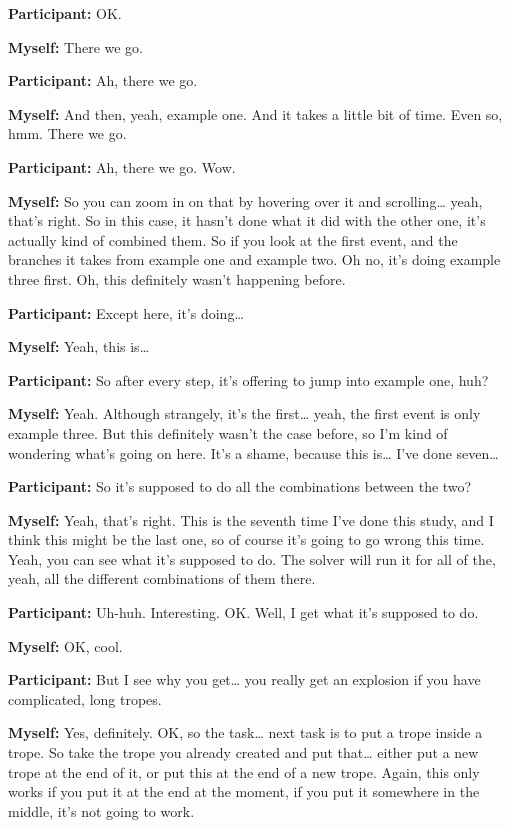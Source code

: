 \documentclass[11pt]{report}
\begin{document}
\begin{linenumbers}
\textbf{Participant:} OK.

\textbf{Myself:} There we go.

\textbf{Participant:} Ah, there we go.

\textbf{Myself:} And then, yeah, example one. And it takes a little bit of time. Even so, hmm. There we go.

\textbf{Participant:} Ah, there we go. Wow.

\textbf{Myself:} So you can zoom in on that by hovering over it and scrolling\ldots{} yeah, that's right. So in this case, it hasn't done what it did with the other one, it's actually kind of combined them. So if you look at the first event, and the branches it takes from example one and example two. Oh no, it's doing example three first. Oh, this definitely wasn't happening before.

\textbf{Participant:} Except here, it's doing\ldots{}

\textbf{Myself:} Yeah, this is\ldots{}

\textbf{Participant:} So after every step, it's offering to jump into example one, huh?

\textbf{Myself:} Yeah. Although strangely, it's the first\ldots{} yeah, the first event is only example three. But this definitely wasn't the case before, so I'm kind of wondering what's going on here. It's a shame, because this is\ldots{} I've done seven\ldots{}

\textbf{Participant:} So it's supposed to do all the combinations between the two?

\textbf{Myself:} Yeah, that's right. This is the seventh time I've done this study, and I think this might be the last one, so of course it's going to go wrong this time. Yeah, you can see what it's supposed to do. The solver will run it for all of the, yeah, all the different combinations of them there.

\textbf{Participant:} Uh-huh. Interesting. OK. Well, I get what it's supposed to do.

\textbf{Myself:} OK, cool.

\textbf{Participant:} But I see why you get\ldots{} you really get an explosion if you have complicated, long tropes.

\textbf{Myself:} Yes, definitely. OK, so the task\ldots{} next task is to put a trope inside a trope. So take the trope you already created and put that\ldots{} either put a new trope at the end of it, or put this at the end of a new trope. Again, this only works if you put it at the end at the moment, if you put it somewhere in the middle, it's not going to work.


\end{linenumbers}
\end{document}
